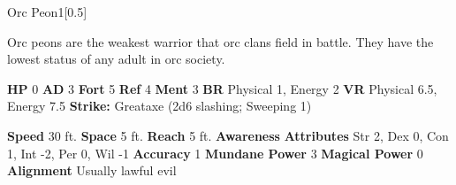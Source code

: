  \begin{monsubsection}{Orc Peon}{1}[0.5]
    \vspace{-1em}\vspace{-1em}
    \vspace{0em}

    
          Orc peons are the weakest warrior that orc clans field in battle.
          They have the lowest status of any adult in orc society.
        

    \begin{spellcontent}
      \begin{spelltargetinginfo}
        \pari \textbf{HP} 0 \monsep
          \textbf{AD} 3 \monsep
          \textbf{Fort} 5 \monsep
          \textbf{Ref} 4 \monsep
          \textbf{Ment} 3
        \pari \textbf{BR} Physical 1, Energy 2 \monsep
        \textbf{VR} Physical 6.5, Energy 7.5
        \pari \textbf{Strike:}
            Greataxe  (2d6 slashing; Sweeping 1)
      \end{spelltargetinginfo}
    \end{spellcontent}
    \begin{monsterfooter}
      \pari \textbf{Speed} 30 ft. \monsep
        \textbf{Space} 5 ft. \monsep
        \textbf{Reach} 5 ft.
      \pari \textbf{Awareness} 
      \pari \textbf{Attributes}
        Str 2, Dex 0,
        Con 1, Int -2,
        Per 0, Wil -1
      \pari \textbf{Accuracy} 1 \monsep
        \textbf{Mundane Power} 3 \monsep
      \textbf{Magical Power} 0
      \pari \textbf{Alignment} Usually lawful evil
    \end{monsterfooter}
  \end{monsubsection}
  
  

